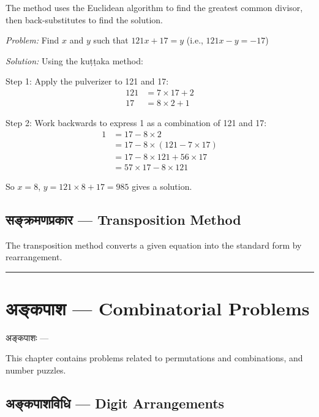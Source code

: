 \documentclass[11pt,a4paper]{book}
\newcommand{\longline}{\noindent\rule{\textwidth}{0.4pt}}
\newenvironment{sanskritverse}{
  \begin{center}
  \begin{minipage}{0.92\textwidth}
  \devanagarifont
  \centering
}{
  \end{minipage}
  \end{center}
  \vspace{0.5em}
}
\begin{document}
The method uses the Euclidean algorithm to find the greatest common divisor, then back-substitutes to find the solution.

\textit{Problem:} Find $x$ and $y$ such that $121x + 17 = y$ (i.e., $121x - y = -17$)

\textit{Solution:} Using the kuṭṭaka method:

Step 1: Apply the pulverizer to 121 and 17:
\begin{align*}
121 &= 7 \times 17 + 2 \\
17 &= 8 \times 2 + 1
\end{align*}

Step 2: Work backwards to express 1 as a combination of 121 and 17:
\begin{align*}
1 &= 17 - 8 \times 2 \\
&= 17 - 8 \times (121 - 7 \times 17) \\
&= 17 - 8 \times 121 + 56 \times 17 \\
&= 57 \times 17 - 8 \times 121
\end{align*}

So $x = 8$, $y = 121 \times 8 + 17 = 985$ gives a solution.

\section{सङ्क्रमणप्रकार — Transposition Method}

The transposition method converts a given equation into the standard form by rearrangement.

\longline

\chapter{अङ्कपाश — Combinatorial Problems}
\label{chap:ankapasha}

\begin{sanskritverse}
अङ्कपाशः —
\end{sanskritverse}

This chapter contains problems related to permutations and combinations, and number puzzles.

\section{अङ्कपाशविधि — Digit Arrangements}
\end{document}
